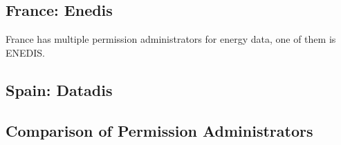 \subsection{France: Enedis}\label{subsec:france:-enedis}
France has multiple permission administrators for energy data, one of them is ENEDIS.


\subsection{Spain: Datadis}\label{subsec:spain:-datadis}

\subsection{Comparison of Permission Administrators}\label{subsec:comparison-of-permission-administrators}